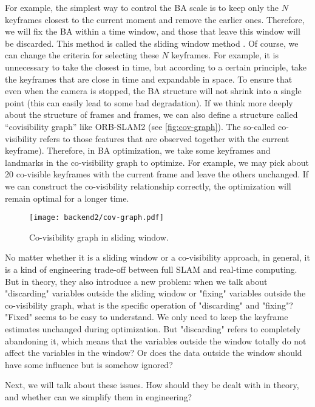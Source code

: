 For example, the simplest way to control the BA scale is to keep only the $N$ keyframes closest to the current moment and remove the earlier ones. Therefore, we will fix the BA within a time window, and those that leave this window will be discarded. This method is called the sliding window method \cite{Sibley2008}. Of course, we can change the criteria for selecting these $N$ keyframes. For example, it is unnecessary to take the closest in time, but according to a certain principle, take the keyframes that are close in time and expandable in space. To ensure that even when the camera is stopped, the BA structure will not shrink into a single point (this can easily lead to some bad degradation). If we think more deeply about the structure of frames and frames, we can also define a structure called ``covisibility graph'' like ORB-SLAM2 \cite{Mur-Artal2015} (see \autoref{fig:cov-graph}). The so-called co-visibility refers to those features that are observed together with the current keyframe). Therefore, in BA optimization, we take some keyframes and landmarks in the co-visibility graph to optimize. For example, we may pick about 20 co-visible keyframes with the current frame and leave the others unchanged. If we can construct the co-visibility relationship correctly, the optimization will remain optimal for a longer time.

\begin{figure}[!ht]
	\centering
	\texttt{[image: backend2/cov-graph.pdf]}
	\caption{Co-visibility graph in sliding window. }
	\label{fig:cov-graph}
\end{figure}

No matter whether it is a sliding window or a co-visibility approach, in general, it is a kind of engineering trade-off between full SLAM and real-time computing. But in theory, they also introduce a new problem: when we talk about "discarding" variables outside the sliding window or "fixing" variables outside the co-visibility graph, what is the specific operation of "discarding" and "fixing"? "Fixed" seems to be easy to understand. We only need to keep the keyframe estimates unchanged during optimization. But "discarding" refers to completely abandoning it, which means that the variables outside the window totally do not affect the variables in the window?  Or does the data outside the window should have some influence but is somehow ignored? 

Next, we will talk about these issues. How should they be dealt with in theory, and whether can we simplify them in engineering?

